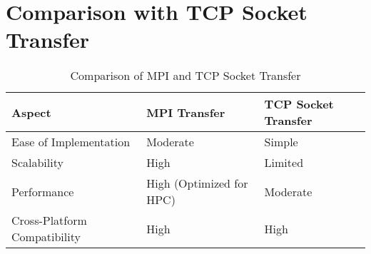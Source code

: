 \documentclass[a4paper,12pt]{article}
\begin{document}
\section{Comparison with TCP Socket Transfer}
\begin{table}[h!]
\centering
\begin{tabular}{|l|l|l|}
\hline
\textbf{Aspect} & \textbf{MPI Transfer} & \textbf{TCP Socket Transfer} \\
\hline
Ease of Implementation & Moderate & Simple \\
\hline
Scalability & High & Limited \\
\hline
Performance & High (Optimized for HPC) & Moderate \\
\hline
Cross-Platform Compatibility & High & High \\
\hline
\end{tabular}
\caption{Comparison of MPI and TCP Socket Transfer}
\end{table}
\end{document}
